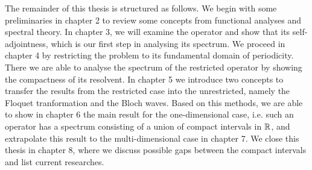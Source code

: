 The remainder of this thesis is structured as follows. We begin with some preliminaries in chapter 2 to review some concepts from functional analyses and spectral theory. In chapter 3, we will examine the operator and show that its self-adjointness, which is our first step in analysing its spectrum. We proceed in chapter 4 by restricting the problem to its fundamental domain of periodicity. There we are able to analyse the spectrum of the restricted operator by showing the compactness of its resolvent. In chapter 5 we introduce two concepts to transfer the results from the restricted case into the unrestricted, namely the Floquet tranformation and the Bloch waves. Based on this methods, we are able to show in chapter 6 the main result for the one-dimensional case, i.e. such an operator has a spectrum consisting of a union of compact intervals in $\mathbb{R}$, and extrapolate this result to the multi-dimensional case in chapter 7. We close this thesis in chapter 8, where we discuss possible gaps between the compact intervals and list current researches.